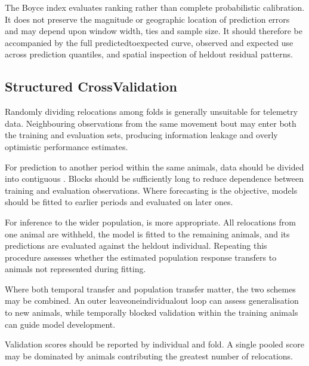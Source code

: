 \documentclass[letterpaper,10pt,english]{sphinxmanual}
\begin{document}
\sphinxAtStartPar
The Boyce index evaluates ranking rather than complete probabilistic calibration. It does not preserve the magnitude or geographic location of prediction errors and may depend upon window width, ties and sample size. It should therefore be accompanied by the full predicted\sphinxhyphen{}to\sphinxhyphen{}expected curve, observed and expected use across prediction quantiles, and spatial inspection of held\sphinxhyphen{}out residual patterns.


\subsection{Structured Cross\sphinxhyphen{}Validation}
\label{\detokenize{theory:structured-cross-validation}}
\sphinxAtStartPar
Randomly dividing relocations among folds is generally unsuitable for telemetry data. Neighbouring observations from the same movement bout may enter both the training and evaluation sets, producing information leakage and overly optimistic performance estimates.

\sphinxAtStartPar
For prediction to another period within the same animals, data should be divided into contiguous . Blocks should be sufficiently long to reduce dependence between training and evaluation observations. Where forecasting is the objective, models should be fitted to earlier periods and evaluated on later ones.

\sphinxAtStartPar
For inference to the wider population,  is more appropriate. All relocations from one animal are withheld, the model is fitted to the remaining animals, and its predictions are evaluated against the held\sphinxhyphen{}out individual. Repeating this procedure assesses whether the estimated population response transfers to animals not represented during fitting.

\sphinxAtStartPar
Where both temporal transfer and population transfer matter, the two schemes may be combined. An outer leave\sphinxhyphen{}one\sphinxhyphen{}individual\sphinxhyphen{}out loop can assess generalisation to new animals, while temporally blocked validation within the training animals can guide model development.

\sphinxAtStartPar
Validation scores should be reported by individual and fold. A single pooled score may be dominated by animals contributing the greatest number of relocations.
\end{document}
